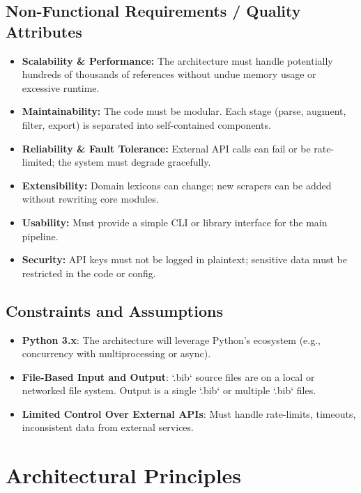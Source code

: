 \documentclass[12pt]{article}
\begin{document}
\subsection{Non-Functional Requirements / Quality Attributes}
\begin{itemize}
  \item \textbf{Scalability \& Performance:} The architecture must handle potentially hundreds of thousands of references without undue memory usage or excessive runtime.
  \item \textbf{Maintainability:} The code must be modular. Each stage (parse, augment, filter, export) is separated into self-contained components.
  \item \textbf{Reliability \& Fault Tolerance:} External API calls can fail or be rate-limited; the system must degrade gracefully. 
  \item \textbf{Extensibility:} Domain lexicons can change; new scrapers can be added without rewriting core modules.
  \item \textbf{Usability:} Must provide a simple CLI or library interface for the main pipeline.
  \item \textbf{Security:} API keys must not be logged in plaintext; sensitive data must be restricted in the code or config.
\end{itemize}

\subsection{Constraints and Assumptions}
\begin{itemize}
  \item \textbf{Python 3.x}: The architecture will leverage Python’s ecosystem (e.g., concurrency with multiprocessing or async).
  \item \textbf{File-Based Input and Output}: `.bib` source files are on a local or networked file system. Output is a single `.bib` or multiple `.bib` files.
  \item \textbf{Limited Control Over External APIs}: Must handle rate-limits, timeouts, inconsistent data from external services.
\end{itemize}

\section{Architectural Principles}
\end{document}
